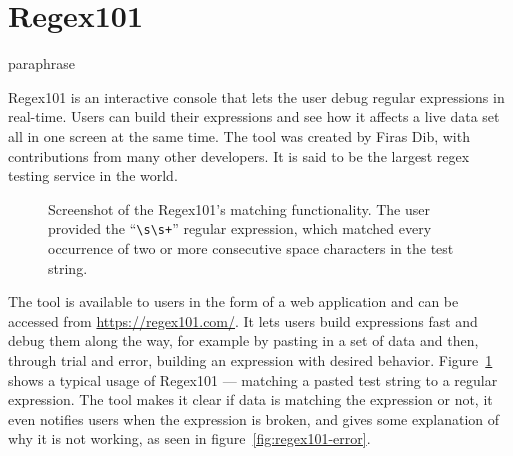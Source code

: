 \documentclass[english,engineering]{wizthesis}
\newcommand{\todo}[1]{%
  \textcolor{red}{[\textbf{TODO}\ifx&#1&{}\else{ }\fi\emph{#1}]}%
}
\begin{document}





\section*{Regex101}

paraphrase{Regex101 \cite{regex101} is an interactive console that lets the user
debug regular expressions in real-time. Users can build their expressions and
see how it affects a live data set all in one screen at the same time. The tool
was created by Firas Dib, with contributions from many other developers. It is
said to be the largest regex testing service in the world.

\begin{figure}[ht]
  \centering
  \caption{Screenshot of the Regex101's matching functionality. The user
  provided the ``\texttt{\textbackslash{}s\textbackslash{}s+}'' regular
  expression, which matched every occurrence of two or more consecutive space
  characters in the test string.}
  \label{fig:regex101-matching}
\end{figure}

The tool is available to users in the form of a web application and can be
accessed from \url{https://regex101.com/}. It lets users build expressions fast
and debug them along the way, for example by pasting in a set of data and then,
through trial and error, building an expression with desired behavior.
Figure~\ref{fig:regex101-matching} shows a typical usage of Regex101 ---
matching a pasted test string to a regular expression. The tool makes it clear
if data is matching the expression or not, it even notifies users when the
expression is broken, and gives some explanation of why it is not working, as
seen in figure~\ref{fig:regex101-error}.

}
\end{document}
